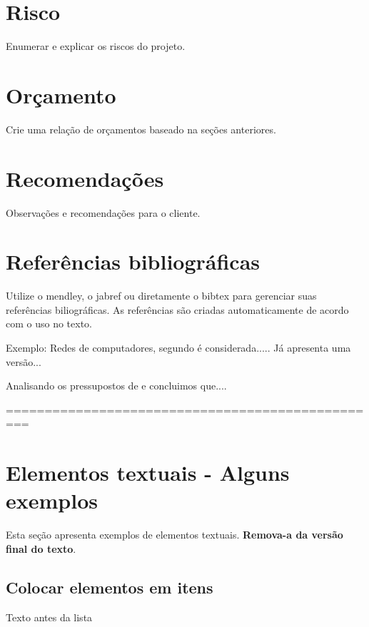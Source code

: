 \documentclass[	DIV=calc,%
							paper=a4,%
							fontsize=12pt,%
							onecolumn]{scrartcl}	 					%
\begin{document}
\section{Risco}
Enumerar e explicar os riscos do projeto.

\section{Orçamento}
Crie uma relação de orçamentos baseado na seções anteriores.

\section{Recomendações}
Observações e recomendações para o cliente.

\section{Referências bibliográficas}
Utilize o mendley, o jabref ou diretamente o bibtex para gerenciar suas referências biliográficas. As referências são criadas automaticamente de acordo com o uso no texto.

Exemplo: Redes de computadores, segundo \cite{t2013} é considerada..... Já \cite{kurose2010} apresenta uma versão...

Analisando os pressupostos de \cite{ref3} e \cite{ref4} concluimos que....


\renewcommand\refname{} %

  

=================================================
\section{Elementos textuais - Alguns exemplos}

Esta seção apresenta exemplos de elementos textuais. \textbf{Remova-a da versão final do texto}.


\subsection{Colocar elementos em itens}

Texto antes da lista
\end{document}
